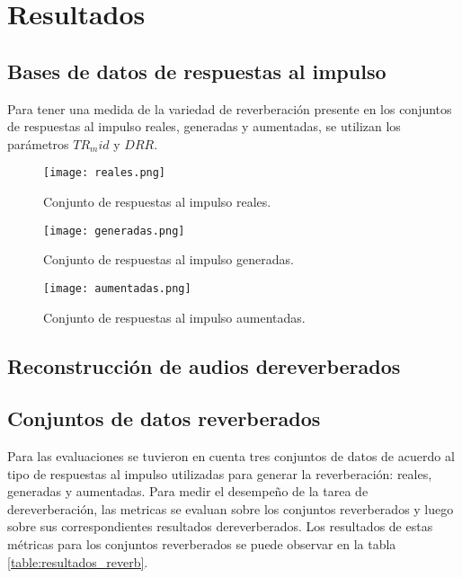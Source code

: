 \section{Resultados}

\subsection{Bases de datos de respuestas al impulso}
Para tener una medida de la variedad de reverberación presente en los conjuntos de respuestas al impulso reales, generadas y aumentadas, se utilizan los parámetros $TR_mid$ y $DRR$. 

\begin{figure}[H]
	\centering{}
	\texttt{[image: reales.png]}
	\caption{Conjunto de respuestas al impulso reales.}
	\label{fig:reales}
\end{figure}

\begin{figure}[H]
	\centering{}
	\texttt{[image: generadas.png]}
	\caption{Conjunto de respuestas al impulso generadas.}
	\label{fig:generadas}
\end{figure}

\begin{figure}[H]
	\centering{}
	\texttt{[image: aumentadas.png]}
	\caption{Conjunto de respuestas al impulso aumentadas.}
	\label{fig:aumentas}
\end{figure}


\subsection{Reconstrucción de audios dereverberados}



\subsection{Conjuntos de datos reverberados}

Para las evaluaciones se tuvieron en cuenta tres conjuntos de datos de acuerdo al tipo de respuestas al impulso utilizadas para generar la reverberación: reales, generadas y aumentadas. Para medir el desempeño de la tarea de dereverberación, las metricas se evaluan sobre los conjuntos reverberados y luego sobre sus correspondientes resultados dereverberados. Los resultados de estas métricas para los conjuntos reverberados se puede observar en la tabla \ref{table:resultados_reverb}. 

